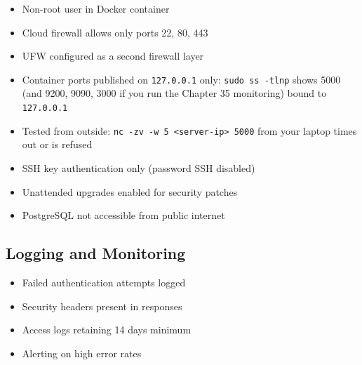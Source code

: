 \begin{itemize}
\tightlist
\item[$\square$]
  Non-root user in Docker container
\item[$\square$]
  Cloud firewall allows only ports 22, 80, 443
\item[$\square$]
  UFW configured as a second firewall layer
\item[$\square$]
  Container ports published on \texttt{127.0.0.1} only: \texttt{sudo\ ss\ -tlnp} shows 5000 (and 9200, 9090, 3000 if you run the Chapter 35 monitoring) bound to \texttt{127.0.0.1}
\item[$\square$]
  Tested from outside: \texttt{nc\ -}\allowbreak{}\texttt{zv\ -}\allowbreak{}\texttt{w\ 5\ \textless{}server-}\allowbreak{}\texttt{ip\textgreater{}\ 5000} from your laptop times out or is refused
\item[$\square$]
  SSH key authentication only (password SSH disabled)
\item[$\square$]
  Unattended upgrades enabled for security patches
\item[$\square$]
  PostgreSQL not accessible from public internet
\end{itemize}

\subsection*{Logging and Monitoring}\label{38-security:logging-and-monitoring}

\begin{itemize}
\item[$\square$]
  Failed authentication attempts logged
\item[$\square$]
  Security headers present in responses
\item[$\square$]
  Access logs retaining 14 days minimum
\item[$\square$]
  Alerting on high error rates
\end{itemize}

